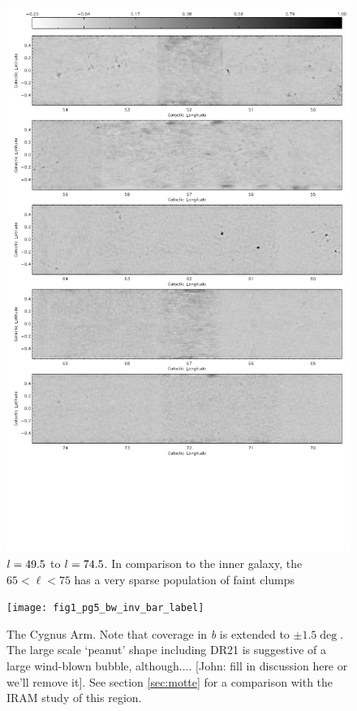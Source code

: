 \begin{figure}
  \begin{minipage}{6.5in} 
    \begin{center}
      \includegraphics[scale=0.9]{fig1_pg3_bw_inv_bar_label}
      \caption{$l=49.5$ to $l=74.5$.  In comparison to the inner galaxy, the $65
      < \ell < 75$ has a very sparse population of faint clumps}
    \end{center}
  \end{minipage}
\end{figure}

\addtocounter{figure}{-1}
\addtocounter{subfig}{1}

\begin{figure}
  \hspace{-1in}
  \texttt{[image: fig1\_pg5\_bw\_inv\_bar\_label]} 
  \caption{The Cygnus Arm. Note that coverage in \emph{b} is extended to $\pm
  1.5\deg$. The large scale `peanut' shape including DR21 is suggestive of a
  large wind-blown bubble, although.... [John: fill in discussion here or we'll
  remove it].  See section \ref{sec:motte} for a comparison with the
  \citet{motte07} IRAM study of this region. }
\end{figure}

